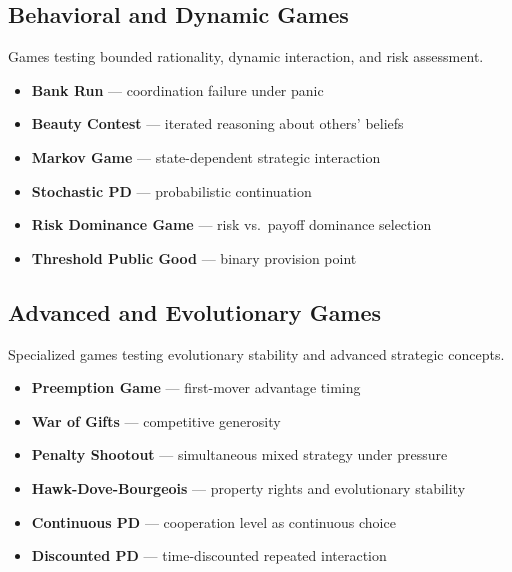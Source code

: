 
\subsection{Behavioral and Dynamic Games}
\label{sec:behavioral}

Games testing bounded rationality, dynamic interaction, and risk assessment.

\begin{itemize}[nosep]
    \item \textbf{Bank Run} --- coordination failure under panic
    \item \textbf{Beauty Contest} --- iterated reasoning about others' beliefs
    \item \textbf{Markov Game} --- state-dependent strategic interaction
    \item \textbf{Stochastic PD} --- probabilistic continuation
    \item \textbf{Risk Dominance Game} --- risk vs.\ payoff dominance selection
    \item \textbf{Threshold Public Good} --- binary provision point
\end{itemize}


\subsection{Advanced and Evolutionary Games}
\label{sec:advanced}

Specialized games testing evolutionary stability and advanced strategic concepts.

\begin{itemize}[nosep]
    \item \textbf{Preemption Game} --- first-mover advantage timing
    \item \textbf{War of Gifts} --- competitive generosity
    \item \textbf{Penalty Shootout} --- simultaneous mixed strategy under pressure
    \item \textbf{Hawk-Dove-Bourgeois} --- property rights and evolutionary stability
    \item \textbf{Continuous PD} --- cooperation level as continuous choice
    \item \textbf{Discounted PD} --- time-discounted repeated interaction
\end{itemize}

